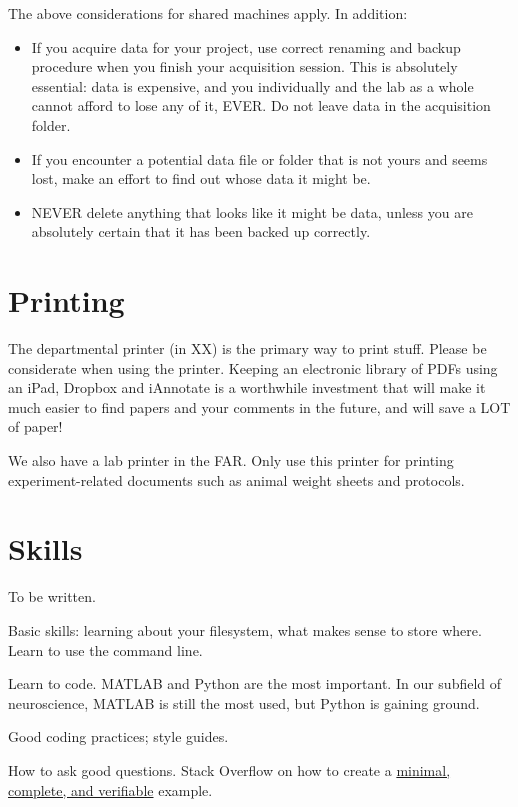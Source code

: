 \documentclass{tufte-book}
\begin{document}
The above considerations for shared machines apply. In addition:

\begin{itemize}
\item{If you acquire data for your project, use correct renaming and
  backup procedure when you finish your acquisition session. This is
  absolutely essential: data is expensive, and you individually and
  the lab as a whole cannot afford to lose any of it, EVER. Do not
  leave data in the acquisition folder.}
\item{If you encounter a potential data file or folder that is not
  yours and seems lost, make an effort to find out whose data it might
  be.}
\item{NEVER delete anything that looks like it might be data, unless
  you are absolutely certain that it has been backed up correctly.}
\end{itemize}


\section{Printing}

The departmental printer (in XX) is the primary way to print
stuff. Please be considerate when using the printer. Keeping an
electronic library of PDFs using an iPad, Dropbox and iAnnotate is a
worthwhile investment that will make it much easier to find papers and
your comments in the future, and will save a LOT of paper!

We also have a lab printer in the FAR. Only use this printer for
printing experiment-related documents such as animal weight sheets and
protocols.

\section{Skills}

To be written.

Basic skills: learning about your filesystem, what makes sense to
store where. Learn to use the command line.

Learn to code. MATLAB and Python are the most important. In our
subfield of neuroscience, MATLAB is still the most used, but Python is
gaining ground.

Good coding practices; style guides.

How to ask good questions. Stack Overflow on how to create a
\href{https://stackoverflow.com/help/mcve}{minimal, complete, and
  verifiable} example.
\end{document}
